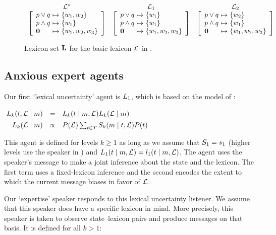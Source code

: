 \documentclass{article}
\begin{document}
\begin{figure}[tp]
  \centering
  \setlength{\arraycolsep}{1pt}    
  $\begin{array}[c]{c c c}
     \LexStar & \Lex_{1} & \Lex_{2} \\
     \disjlexicon{w_{1}, w_{2}}{w_{1}}
     & 
     \disjlexicon{w_{1}}{w_{1}}
     & 
     \disjlexicon{w_{2}}{w_{1}}
  \end{array}$
  \caption{Lexicon set $\LexSet$ for the basic lexicon $\Lex$ in .}
  \label{fig:disjlexica}
\end{figure}


\subsection{Anxious expert agents}\label{sec:full}

Our first `lexical uncertainty' agent is $\ListenerK[1]$, which is based
on the model of \citet{Smith:Goodman:Frank:2013}:
%
\begin{examples}
  \item\label{L1}%
    \setlength{\arraycolsep}{2pt}%
    $\mspace{-4mu}\begin{array}[t]{r c l}
      \ListenerK(\state, \Lex \given \msg) 
      &=&
      \ListenerK(\state \given \msg, \Lex) \ListenerK(\Lex \given \msg) 
      \\[1ex]
      \ListenerK(\Lex \given \msg) 
      &\propto& 
      \Prior(\Lex) \sum_{\state\in\States} \SpeakerK(\msg \given \state, \Lex)\Prior(\state)
    \end{array}$
\end{examples}
%
This agent is defined for levels $k \geqslant 1$ as long as we assume
that $\SpeakerK[1] = \speakerOne$ (higher levels use the speaker in
) and
$\ListenerK[1](\state \given \msg, \Lex) = \listenerOne(\state
\given \msg, \Lex)$.
The agent uses the speaker's message to make a joint inference about
the state and the lexicon. The first term uses a fixed-lexicon
inference and the second encodes the extent to which the current
message biases in favor of $\Lex$.

Our `expertise' speaker responds to this lexical uncertainty listener.
We assume that this speaker does have a specific lexicon in mind.  More
precisely, this speaker is taken to observe state--lexicon pairs and
produce messages on that basis. It is defined for all $k > 1$:
\end{document}
